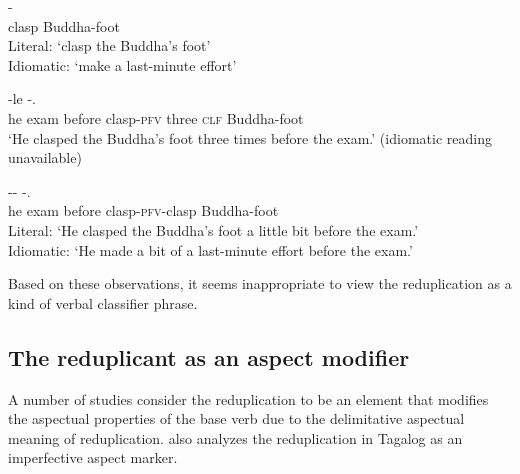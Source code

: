 \ea
  \ea\label{ex:idiom}
  \gll {} -\\
  clasp Buddha-foot\\
   \glt Literal: `clasp the Buddha's foot'\\
   Idiomatic: `make a last-minute effort'
   
   \ex\label{ex:clf-idiom}
   \gll {}   -le   -.\\
   he exam before clasp-\textsc{pfv} three \textsc{clf} Buddha-foot\\
   \glt `He clasped the Buddha's foot three times before the exam.' (idiomatic reading unavailable)
   
   \ex\label{ex:redup-idiom}
   \gll {}   -- -.\\
   he exam before clasp-\textsc{pfv}-clasp Buddha-foot\\
   \glt Literal: `He clasped the Buddha's foot a little bit before the exam.'\\
   Idiomatic: `He made a bit of a last-minute effort before the exam.'
\z
\z

Based on these observations, it seems inappropriate to view the reduplication as a kind of verbal classifier phrase.






\subsection{The reduplicant as an aspect modifier}\label{sec:asp}

A number of studies consider the reduplication to be an element that modifies the aspectual properties of the base verb \citep{Arcodiaetal2014, BascianoMelloni2017, YangWei2017} 
due to the delimitative aspectual meaning of reduplication. 
\citet{Travis1999, Travis2000} also analyzes the reduplication in Tagalog as an imperfective aspect marker.
 
 
 
 
 
